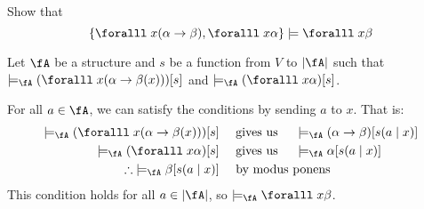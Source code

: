 \begin{problem}[3]
  Show that
  \[
    \set{\forall x (\alpha \to \beta), \forall x \alpha} \models \forall x \beta
  \]
\end{problem}
\begin{Answer}
  Let $\fA$ be a structure and $s$ be a function from $V$ to $\abs{\fA}$
  such that $\models_{\fA} (\forall x(\alpha \to \beta(x)))[s]$
  and $\models_{\fA} (\forall x \alpha)[s]$.

  \step
  For all $a \in \fA$, we can satisfy the conditions by sending $a$ to $x$.
  That is:
  \begin{align*}
    \models_{\fA} (\forall x(\alpha \to \beta(x)))[s] \quad &\text{ gives us }
    \quad \models_{\fA} (\alpha \to \beta)[s (a \mid x)] \\
    \models_{\fA} (\forall x \alpha)[s] \quad &\text{ gives us } \quad
    \models_{\fA} \alpha[s (a \mid x)] \\
    \Therefore \models_{\fA} \beta[s (a \mid x)] \quad &\text{ by modus ponens }
  \end{align*}
  This condition holds for all $a \in \abs{\fA}$, so $\models_{\fA} \forall x \beta$.
\end{Answer}
